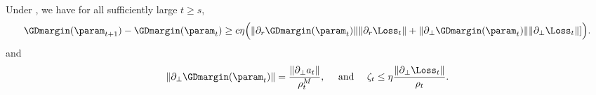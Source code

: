 \begin{lemma}
\label{lem: Decomposition of raidal and spherical parts for GD}
Under , we have for all sufficiently large $t \ge s$, 
\begin{equation}
\label{eq: decomp-gamma-GD}
    \GDmargin (\param_{t+1}) - \GDmargin (\param_t) \ge c \eta \Big(\| \partial_r \GDmargin (\param_t) \| \| \partial_r \Loss_t\| + \| \partial_\perp \GDmargin (\param_t) \| \| \partial_\perp \Loss_t\| ]\Big).
\end{equation}
and 
\begin{equation}
\label{eq: decomp-zeta-GD}
\|\partial_\perp \GDmargin (\param_t) \|= \frac{\|\partial_\perp a_t \|}{\rho_t^M} , \quad \text{ and } \quad \zeta_t \le  \eta \frac{\| \partial_\perp \Loss_t\|}{\rho_t}.
\end{equation}
\end{lemma}

